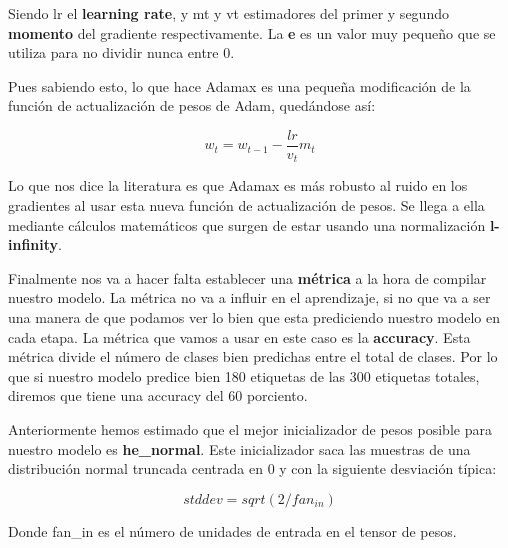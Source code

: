 Siendo lr el \textbf{learning rate}, y mt y vt estimadores del primer y segundo \textbf{momento} del gradiente respectivamente. La \textbf{e} es un valor muy pequeño que se utiliza para no dividir nunca entre 0.

\vspace{5 mm}

Pues sabiendo esto, lo que hace Adamax es una pequeña modificación de la función de actualización de pesos de Adam, quedándose así:

\[w_t = w_{t-1} - \frac{lr}{v_t} m_t   \]

Lo que nos dice la literatura es que Adamax es más robusto al ruido en los gradientes al usar esta nueva función de actualización de pesos. Se llega a ella mediante cálculos matemáticos que surgen de estar usando una normalización \textbf{l-infinity}.

\vspace{5 mm}

Finalmente nos va a hacer falta establecer una \textbf{métrica} a la hora de compilar nuestro modelo. La métrica no va a influir en el aprendizaje, si no que va a ser una manera de que podamos ver lo bien que esta prediciendo nuestro modelo en cada etapa. La métrica que vamos a usar en este caso es la \textbf{accuracy}. Esta métrica divide el número de clases bien predichas entre el total de clases. Por lo que si nuestro modelo predice bien 180 etiquetas de las 300 etiquetas totales, diremos que tiene una accuracy del 60 porciento.

\vspace{5 mm}

Anteriormente hemos estimado que el mejor inicializador de pesos posible para nuestro modelo es \textbf{he\_normal}. Este inicializador saca las muestras de una distribución normal truncada centrada en 0 y con la siguiente desviación típica:

\[stddev = sqrt(2 / fan_{in})\]

Donde fan\_in es el número de unidades de entrada en el tensor de pesos.
